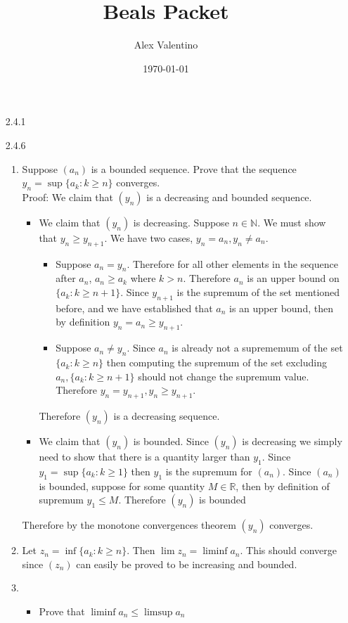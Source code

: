 \documentclass[12pt, letterpaper]{article}
\date{\today}
\author{Alex Valentino}
\title{Beals Packet}
\newcommand{\N}{\mathbb{N}}
\newcommand{\R}{\mathbb{R}}
\begin{document}
	\begin{enumerate}
		\item[2.4.1]
		\item[2.4.6]
		\begin{enumerate}
			\item Suppose $(a_n)$ is a bounded sequence.  Prove that the sequence $y_n = \sup\{a_k: k \geq n\}$ converges.\\
			Proof:  We claim that $(y_n)$ is a decreasing and bounded sequence.  
			\begin{itemize}
				\item We claim that $(y_n)$ is decreasing.  Suppose $n \in \N$.  We must show that $y_n \geq y_{n+1}$.  We have two cases, $y_n = a_n, y_n \neq a_n$.
				\begin{itemize}
					\item Suppose $a_n = y_n$.  Therefore for all other elements in the sequence after $a_n$, $a_n \geq a_k$ where $k > n$.  Therefore $a_n$ is an upper bound on $\{a_k : k \geq n + 1\}$.  Since $y_{n+1}$ is the supremum of the set mentioned before, and we have established that $a_n$ is an upper bound, then by definition $y_n = a_n \geq y_{n+1}$.  
					\item Suppose $a_n \neq y_n$.  Since $a_n$ is already not a suprememum of the set $\{a_k : k \geq n\}$ then computing the supremum of the set excluding $a_n, \{a_k : k \geq n + 1\}$ should not change the supremum value.  Therefore $y_n = y_{n+1}, y_n \geq y_{n+1}$.
				\end{itemize}
				Therefore $(y_n)$ is a decreasing sequence. 
				\item We claim that $(y_n)$ is bounded.  Since $(y_n)$ is decreasing we simply need to show that there is a quantity larger than $y_1$.  Since $y_1 = \sup \{a_k : k \geq 1\}$ then $y_1$ is the supremum for $(a_n)$.  
				Since $(a_n)$ is bounded, suppose for some quantity $M \in \R$,	then by definition of supremum $y_1 \leq M$.  Therefore $(y_n)$ is bounded				  
			\end{itemize}
			Therefore by the monotone convergences theorem $(y_n)$ converges.
			\item Let $z_n = \inf \{ a_k : k \geq n\}$.  Then $\lim z_n = \liminf a_n$.  This should converge since $(z_n)$ can easily be proved 
			to be increasing and bounded.
			\item 
			\begin{itemize}
				\item Prove that $\liminf a_n \leq \limsup a_n$\\

\end{itemize}
\end{enumerate}
\end{enumerate}
\end{document}
